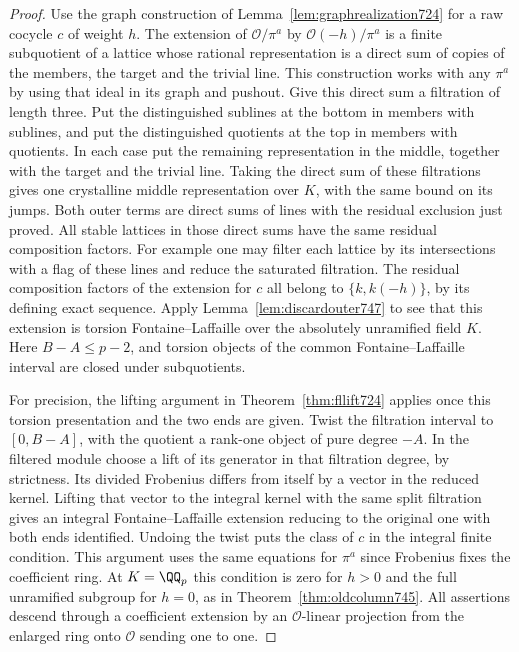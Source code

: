 \documentclass[a4paper,11pt]{article}
\theoremstyle{definition}
\theoremstyle{remark}
\numberwithin{equation}{section}
\begin{document}
\begin{proof}
Use the graph construction of Lemma~\ref{lem:graphrealization724}
for a raw cocycle \(c\) of weight \(h\). The extension of
\(\mathcal O/\pi^a\) by \(\mathcal O(-h)/\pi^a\) is a finite
subquotient of a lattice whose rational representation is a
direct sum of copies of the members, the target and the trivial
line. This construction works with any \(\pi^a\) by using that
ideal in its graph and pushout. Give this direct sum a filtration
of length three. Put the distinguished sublines at the bottom
in members with sublines, and put the distinguished quotients
at the top in members with quotients. In each case put the
remaining representation in the middle, together with the
target and the trivial line. Taking the direct sum of these
filtrations gives one crystalline middle representation over
\(K\), with the same bound on its jumps. Both outer terms are
direct sums of lines with the residual exclusion just proved.
All stable lattices in those direct sums have the same residual
composition factors. For example one may filter each lattice
by its intersections with a flag of these lines and reduce the
saturated filtration. The residual composition factors of the
extension for \(c\) all belong to
\(\{k,k(-h)\}\), by its defining exact sequence. Apply
Lemma~\ref{lem:discardouter747} to see that this extension is
torsion Fontaine--Laffaille over the absolutely unramified field
\(K\). Here \(B-A\le p-2\), and torsion objects of the common
Fontaine--Laffaille interval are closed under subquotients.

For precision, the lifting argument in
Theorem~\ref{thm:fllift724} applies once this torsion presentation
and the two ends are given. Twist the filtration interval to
\([0,B-A]\), with the quotient a rank-one object of pure degree
\(-A\). In the filtered module choose a lift of its generator
in that filtration degree, by strictness. Its divided Frobenius
differs from itself by a vector in the reduced kernel. Lifting
that vector to the integral kernel with the same split filtration
gives an integral Fontaine--Laffaille extension reducing to the
original one with both ends identified. Undoing the twist puts
the class of \(c\) in the integral finite condition. This argument
uses the same equations for \(\pi^a\) since Frobenius fixes the
coefficient ring. At \(K=\QQ_p\) this condition is zero for
\(h>0\) and the full unramified subgroup for \(h=0\), as in
Theorem~\ref{thm:oldcolumn745}. All assertions descend through
a coefficient extension by an \(\mathcal O\)-linear projection
from the enlarged ring onto \(\mathcal O\) sending one to one.
\end{proof}
\end{document}
